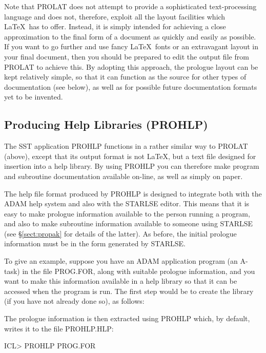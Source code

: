 \documentclass[twoside,11pt,nolof]{starlink}
\begin{document}
Note that PROLAT does not attempt to provide a sophisticated text-processing
language and does not, therefore, exploit all the layout facilities which
\LaTeX\ has to offer.
Instead, it is simply intended for achieving a close approximation to the
final form of a document as quickly and easily as possible.
If you want to go further and use fancy \LaTeX\ fonts or an extravagant layout
in your final document, then you should be prepared to edit the output file
from PROLAT to achieve this.
By adopting this approach, the prologue layout can be kept relatively
simple, so that it can function as the source for other types of
documentation (see below), as well as for possible future documentation
formats yet to be invented.

\subsection{Producing Help Libraries (PROHLP)}

The SST application PROHLP functions in a rather similar way to PROLAT
(above), except that its output format is not \LaTeX, but a text file
designed for insertion into a help library.
By using PROHLP you can therefore make program and subroutine documentation
available on-line, as well as simply on paper.

The help file format produced by PROHLP is designed to integrate both with
the ADAM help system and also with the STARLSE editor.
This means that it is easy to make prologue information available to the
person running a program, and also to make subroutine information available
to someone using STARLSE (see \S\ref{sect:propak} for details of the
latter).
As before, the initial prologue information must be in the form generated by
STARLSE.

To give an example, suppose you have an ADAM application program (an A-task)
in the file PROG.FOR, along with suitable prologue information, and you want
to make this information available in a help library so that it can be
accessed when the program is run.
The first step would be to create the library (if you have not already done
so), as follows:


The prologue information is then extracted using PROHLP which, by default,
writes it to the file PROHLP.HLP:

\begin{terminalv}
ICL> PROHLP PROG.FOR
\end{terminalv}
\end{document}
